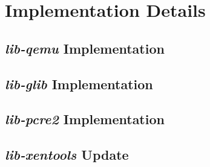 \chapter{Implementation Details}
\label{chapter:implementation-details}

\section{\textit{lib-qemu} Implementation}
\label{sec:impl-lib-qemu}

\section{\textit{lib-glib} Implementation}
\label{sec:impl-lib-glib}

\section{\textit{lib-pcre2} Implementation}
\label{impl-lib-pcre2}

\section{\textit{lib-xentools} Update}
